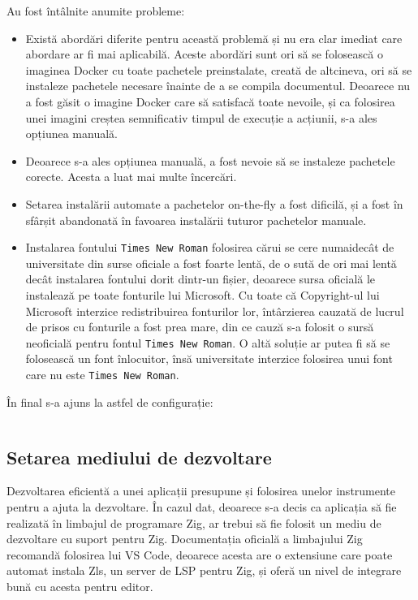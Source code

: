 \documentclass[a4paper,12pt]{report}
\begin{document}
Au fost întâlnite anumite probleme:
\begin{itemize}
    \item 
    Există abordări diferite pentru această problemă și nu era clar imediat care abordare ar fi
    mai aplicabilă.
    Aceste abordări sunt ori să se folosească o imaginea Docker cu toate pachetele preinstalate,
    creată de altcineva, ori să se instaleze pachetele necesare înainte de a se compila documentul.
    Deoarece nu a fost găsit o imagine Docker care să satisfacă toate nevoile,
    și ca folosirea unei imagini creștea semnificativ timpul de execuție a acțiunii,
    s-a ales opțiunea manuală.

    \item
    Deoarece s-a ales opțiunea manuală, a fost nevoie să se instaleze pachetele corecte.
    Acesta a luat mai multe încercări.

    \item
    Setarea instalării automate a pachetelor on-the-fly a fost dificilă,
    și a fost în sfârșit abandonată în favoarea instalării tuturor pachetelor manuale.

    \item
    Instalarea fontului \texttt{Times New Roman} folosirea cărui se cere numaidecât de universitate
    din surse oficiale a fost foarte lentă, de o sută de ori mai lentă decât instalarea fontului dorit
    dintr-un fișier, deoarece sursa oficială le instalează pe toate fonturile lui Microsoft.
    Cu toate că Copyright-ul lui Microsoft interzice redistribuirea fonturilor lor,
    întârzierea cauzată de lucrul de prisos cu fonturile a fost prea mare,
    din ce cauză s-a folosit o sursă neoficială pentru fontul \texttt{Times New Roman}.
    O altă soluție ar putea fi să se folosească un font înlocuitor, însă
    universitate interzice folosirea unui font care nu este \texttt{Times New Roman}.
\end{itemize}

În final s-a ajuns la astfel de configurație:

\inputminted{cs}{../.github/workflows/latex.yml}


\subsection{Setarea mediului de dezvoltare}

Dezvoltarea eficientă a unei aplicații presupune și folosirea
unelor instrumente pentru a ajuta la dezvoltare.
În cazul dat, deoarece s-a decis ca aplicația să fie realizată în limbajul de programare Zig,
ar trebui să fie folosit un mediu de dezvoltare cu suport pentru Zig.
Documentația oficială a limbajului Zig\cite{zig} recomandă folosirea lui VS Code, deoarece acesta
are o extensiune care poate automat instala Zls\cite{zls}, un server de LSP pentru Zig,
și oferă un nivel de integrare bună cu acesta pentru editor.
\end{document}
